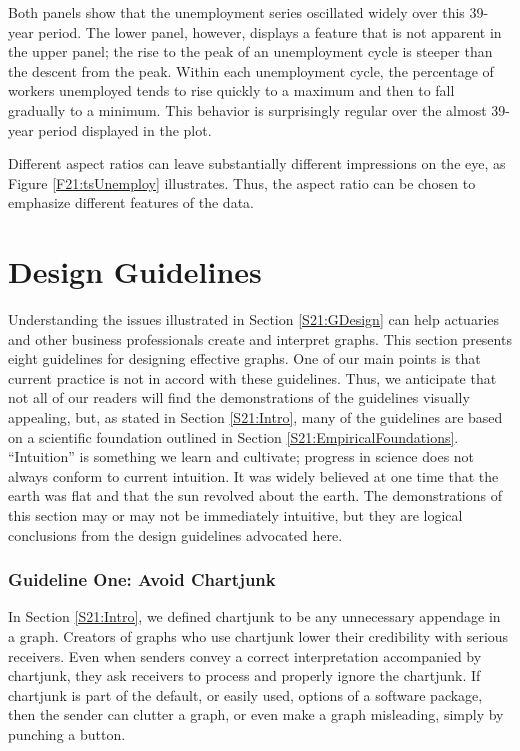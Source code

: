 
Both panels show that the unemployment series oscillated widely over
this 39-year period. The lower panel, however, displays a feature
that is not apparent in the upper panel; the rise to the peak of an
unemployment cycle is steeper than the descent from the peak. Within
each unemployment cycle, the percentage of workers unemployed tends
to rise quickly to a maximum and then to fall gradually to a
minimum. This behavior is surprisingly regular over the almost
39-year period displayed in the plot.

Different aspect ratios can leave substantially different
impressions on the eye, as Figure \ref{F21:tsUnemploy} illustrates.
Thus, the aspect ratio can be chosen to emphasize different features
of the data.

\linejed

\section{Design Guidelines}\label{S21:DesignGuide}

Understanding the issues illustrated in Section \ref{S21:GDesign}
can help actuaries and other business professionals create and
interpret graphs. This section presents eight guidelines for
designing effective graphs. One of our main points is that current
practice is not in accord with these guidelines. Thus, we anticipate
that not all of our readers will find the demonstrations of the
guidelines visually appealing, but, as stated in Section
\ref{S21:Intro}, many of the guidelines are based on a scientific
foundation outlined in Section \ref{S21:EmpiricalFoundations}.
``Intuition'' is something we learn and cultivate; progress in
science does not always conform to current intuition. It was widely
believed at one time that the earth was flat and that the sun
revolved about the earth. The demonstrations of this section may or
may not be immediately intuitive, but they are logical conclusions
from the design guidelines advocated here.

\subsubsection*{Guideline One: Avoid Chartjunk}

In Section \ref{S21:Intro}, we defined chartjunk to be any
unnecessary appendage in a graph. Creators of graphs who use
chartjunk lower their credibility with serious receivers. Even when
senders convey a correct interpretation accompanied by chartjunk,
they ask receivers to process and properly ignore the chartjunk. If
chartjunk is part of the default, or easily used, options of a
software package, then the sender can clutter a graph, or even make
a graph misleading, simply by punching a button.

